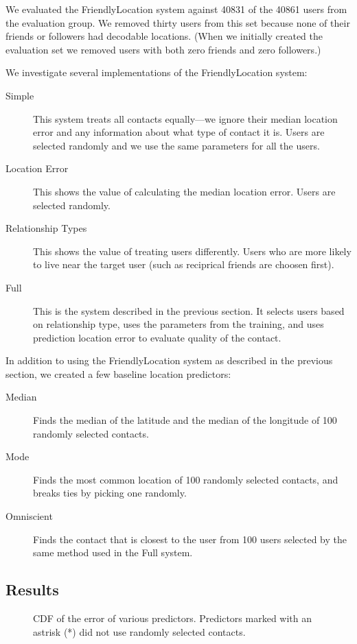 \documentclass{sig-alternate}
\begin{document}
We evaluated the FriendlyLocation system against 40831 of the 40861 users from the evaluation group.
We removed thirty users from this set because none of their friends or
followers had decodable locations.
(When we initially created the evaluation
set we removed users with both zero friends and zero followers.)

We investigate several implementations of the FriendlyLocation system:
\begin{description}
\item[Simple] This system treats all contacts equally---we ignore their median location error and any information about what type of contact it is. Users are selected randomly and we use the same parameters for all the users.
\item[Location Error] This shows the value of calculating the median location error. Users are selected randomly.
\item[Relationship Types] This shows the value of treating users differently. Users who are more likely to live near the target user (such as reciprical friends are choosen first).
\item[Full] This is the system described in the previous section. It selects users based on relationship type, uses the parameters from the training, and uses
prediction location error to evaluate quality of the contact.
\end{description}

In addition to using the FriendlyLocation system as described in the previous section, we created a few baseline location predictors:
\begin{description}
\item[Median] Finds the median of the latitude and the median of the longitude of 100 randomly selected contacts.
\item[Mode] Finds the most common location of 100 randomly selected contacts, and breaks ties by picking one randomly.
\item[Omniscient] Finds the contact that is closest to the user from 100 users selected by the same method used in the Full system.
\end{description}

\subsection{Results}
\begin{figure}
\centering
{}
\caption{
CDF of the error of various predictors. Predictors marked with an astrisk (*)
did not use randomly selected contacts.
}
\label{fig:FinalResults}
\end{figure}
\end{document}
